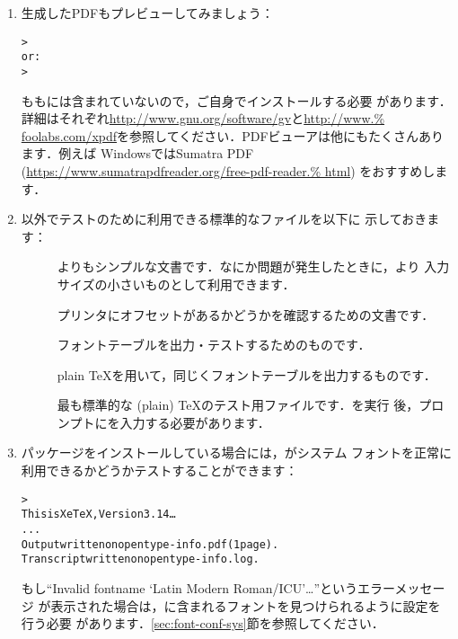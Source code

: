 \documentclass[uplatex,dvipdfmx]{jsarticle}
\begin{document}
\begin{enumerate}
\item 生成したPDFもプレビューしてみましょう：
%
\begin{alltt}
> 
\textrm{or:}
> 
\end{alltt}
%
もも\TL には含まれていないので，ご自身でインストールする必要
があります．詳細はそれぞれ\url{http://www.gnu.org/software/gv}と\url{http://www.%
foolabs.com/xpdf}を参照してください．PDFビューアは他にもたくさんあります．例えば
WindowsではSumatra PDF (\url{https://www.sumatrapdfreader.org/free-pdf-reader.%
html}) をおすすめします．

\item {}以外でテストのために利用できる標準的なファイルを以下に
示しておきます：
%
\begin{description}
\item []
よりもシンプルな文書です．なにか問題が発生したときに，より
入力サイズの小さいものとして利用できます．

\item []
プリンタにオフセットがあるかどうかを確認するための文書です．

\item []
フォントテーブルを出力・テストするためのものです．

\item []
plain \TeX を用いて，同じくフォントテーブルを出力するものです．

\item []
最も標準的な (plain) \TeX のテスト用ファイルです．を実行
後，\code{*}プロンプトにを入力する必要があります．
\end{description}

\item {}パッケージをインストールしている場合には，\XeTeX がシステム
フォントを正常に利用できるかどうかテストすることができます：
%
\begin{alltt}
> 
This is XeTeX, Version 3.14\dots
...
Output written on opentype-info.pdf (1 page).
Transcript written on opentype-info.log.
\end{alltt}
%
もし``Invalid fontname `Latin Modern Roman/ICU'\dots''というエラーメッセージ
が表示された場合は，\TL に含まれるフォントを見つけられるように設定を行う必要
があります．\ref{sec:font-conf-sys}節を参照してください．
\end{enumerate}
\end{document}
